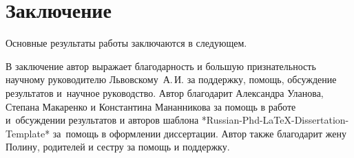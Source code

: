 \chapter*{Заключение}                       %


Основные результаты работы заключаются в следующем.


В заключение автор выражает благодарность и большую признательность научному руководителю
Львовскому~А.\,И. за поддержку, помощь, обсуждение результатов и~научное руководство. Автор благодарит Александра Уланова, Степана Макаренко и Константина Мананникова за помощь в работе и~обсуждении результатов и авторов шаблона *Russian-Phd-LaTeX-Dissertation-Template* за~помощь в оформлении диссертации. Автор также благодарит жену Полину, родителей и сестру за помощь и поддержку. 
